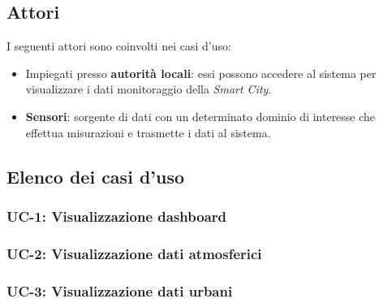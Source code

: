 \subsection{Attori}
I seguenti attori sono coinvolti nei casi d'uso:
\begin{itemize}
	\item Impiegati presso \textbf{autorità locali}: essi possono accedere al sistema per visualizzare i dati
	      monitoraggio della \textit{Smart City}.
	\item \textbf{Sensori}: sorgente di dati con un determinato dominio di interesse che effettua misurazioni
	      e trasmette i dati al sistema.
\end{itemize}

\subsection{Elenco dei casi d'uso}
\subsubsection{UC-1: Visualizzazione dashboard}

\subsubsection{UC-2: Visualizzazione dati atmosferici}

\subsubsection{UC-3: Visualizzazione dati urbani}

